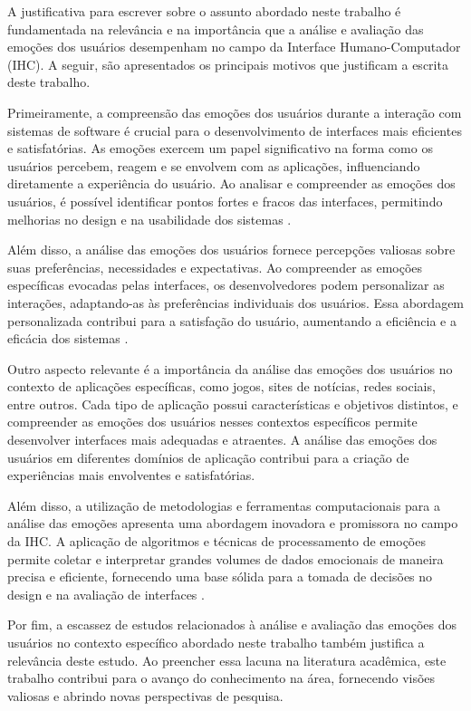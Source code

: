 A justificativa para escrever sobre o assunto abordado neste trabalho é fundamentada na relevância e na importância que a análise e avaliação das emoções dos usuários desempenham no campo da Interface Humano-Computador (IHC). A seguir, são apresentados os principais motivos que justificam a escrita deste trabalho.

Primeiramente, a compreensão das emoções dos usuários durante a interação com sistemas de software é crucial para o desenvolvimento de interfaces mais eficientes e satisfatórias. As emoções exercem um papel significativo na forma como os usuários percebem, reagem e se envolvem com as aplicações, influenciando diretamente a experiência do usuário. Ao analisar e compreender as emoções dos usuários, é possível identificar pontos fortes e fracos das interfaces, permitindo melhorias no design e na usabilidade dos sistemas \cite{6}.

Além disso, a análise das emoções dos usuários fornece percepções valiosas sobre suas preferências, necessidades e expectativas. Ao compreender as emoções específicas evocadas pelas interfaces, os desenvolvedores podem personalizar as interações, adaptando-as às preferências individuais dos usuários. Essa abordagem personalizada contribui para a satisfação do usuário, aumentando a eficiência e a eficácia dos sistemas \cite{7}.

Outro aspecto relevante é a importância da análise das emoções dos usuários no contexto de aplicações específicas, como jogos, sites de notícias, redes sociais, entre outros. Cada tipo de aplicação possui características e objetivos distintos, e compreender as emoções dos usuários nesses contextos específicos permite desenvolver interfaces mais adequadas e atraentes. A análise das emoções dos usuários em diferentes domínios de aplicação contribui para a criação de experiências mais envolventes e satisfatórias.

Além disso, a utilização de metodologias e ferramentas computacionais para a análise das emoções apresenta uma abordagem inovadora e promissora no campo da IHC. A aplicação de algoritmos e técnicas de processamento de emoções permite coletar e interpretar grandes volumes de dados emocionais de maneira precisa e eficiente, fornecendo uma base sólida para a tomada de decisões no design e na avaliação de interfaces \cite{8}.

Por fim, a escassez de estudos relacionados à análise e avaliação das emoções dos usuários no contexto específico abordado neste trabalho também justifica a relevância deste estudo. Ao preencher essa lacuna na literatura acadêmica, este trabalho contribui para o avanço do conhecimento na área, fornecendo visões valiosas e abrindo novas perspectivas de pesquisa.

